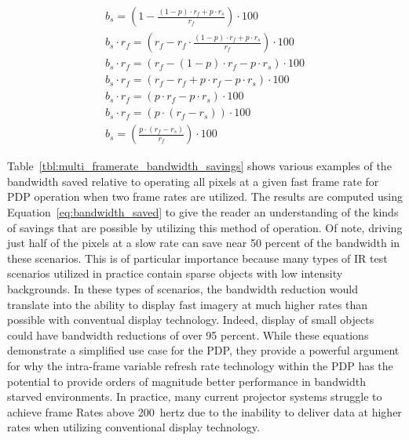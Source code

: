     \begin{equation}
        \begin{array}{ l }
            \displaystyle b_s=\left(1-\frac{(1-p)\cdot r_f + p\cdot r_s}{r_f}\right)\cdot 100 \\[16pt]
            \displaystyle b_s \cdot r_f=\left(r_f-r_f \cdot \frac{(1-p)\cdot r_f + p\cdot r_s}{r_f}\right)\cdot 100 \\[13pt]
            \displaystyle b_s \cdot r_f= (r_f - (1-p)\cdot r_f - p\cdot r_s)\cdot 100 \\[13pt]
            \displaystyle b_s \cdot r_f= (r_f - r_f + p \cdot r_f - p\cdot r_s)\cdot 100 \\[13pt]
            \displaystyle b_s \cdot r_f= (p \cdot r_f - p\cdot r_s)\cdot 100 \\[13pt]
            \displaystyle b_s \cdot r_f= (p \cdot (r_f - r_s))\cdot 100 \\[13pt]
            \displaystyle b_s=\left(\frac{p \cdot (r_f-r_s)}{r_f}\right)\cdot 100
        \end{array}
        \label{eq:bandwidth_saved}
    \end{equation}

    Table~\ref{tbl:multi_framerate_bandwidth_savings} shows various examples of the bandwidth saved relative to operating all pixels at a given fast frame rate for PDP operation when two frame rates are utilized. The results are computed using Equation~\eqref{eq:bandwidth_saved} to give the reader an understanding of the kinds of savings that are possible by utilizing this method of operation. Of note, driving just half of the pixels at a slow rate can save near 50 percent of the bandwidth in these scenarios. This is of particular importance because many types of IR test scenarios utilized in practice contain sparse objects with low intensity backgrounds. In these types of scenarios, the bandwidth reduction would translate into the ability to display fast imagery at much higher rates than possible with conventual display technology. Indeed, display of small objects could have bandwidth reductions of over 95 percent. While these equations demonstrate a simplified use case for the PDP, they provide a powerful argument for why the intra-frame variable refresh rate technology within the PDP has the potential to provide orders of magnitude better performance in bandwidth starved environments. In practice, many current projector systems struggle to achieve frame Rates above \mbox{200 hertz} due to the inability to deliver data at higher rates when utilizing conventional display technology.

